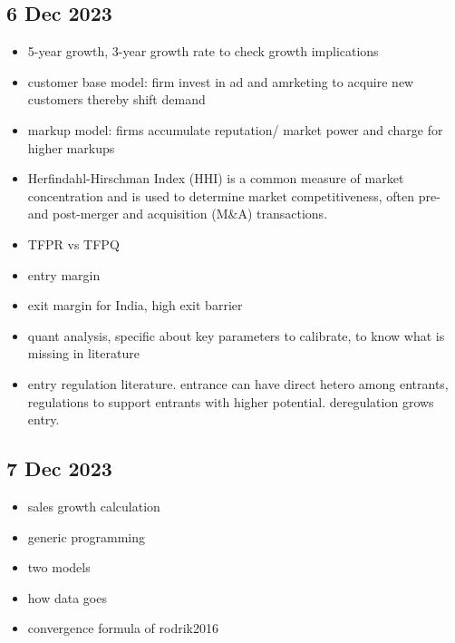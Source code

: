 	\subsection{6 Dec 2023}
		\begin{itemize}
			\item 5-year growth, 3-year growth rate to check growth implications
			\item customer base model: firm invest in ad and amrketing to acquire new customers thereby shift demand
			\item markup model: firms accumulate reputation/ market power and charge for higher markups
			\item Herfindahl-Hirschman Index (HHI) is a common measure of market concentration and is used to determine market competitiveness, often pre- and post-merger and acquisition (M\&A) transactions.
			\item TFPR vs TFPQ
			\item entry margin
			\item exit margin for India, high exit barrier
			\item quant analysis, specific about key parameters to calibrate, to know what is missing in literature
			\item entry regulation literature. entrance can have direct hetero among entrants, regulations to support entrants with higher potential. deregulation grows entry.
		\end{itemize}
		
	\subsection{7 Dec 2023}
		\begin{itemize}
			\item sales growth  calculation
			\item generic programming
			\item two models
			\item how data goes
			\item convergence formula of rodrik2016
		\end{itemize}
\newpage

\footnotesize



